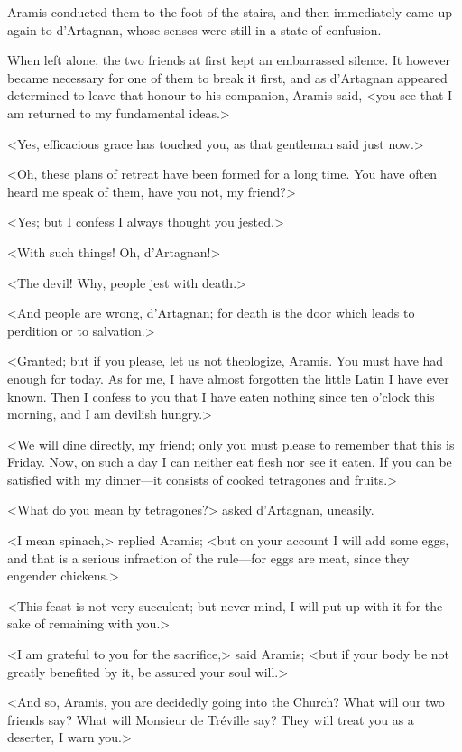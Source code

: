 Aramis conducted them to the foot of the stairs, and then immediately came up again to d'Artagnan, whose senses were still in a state of confusion. 

When left alone, the two friends at first kept an embarrassed silence. It however became necessary for one of them to break it first, and as d'Artagnan appeared determined to leave that honour to his companion, Aramis said, <you see that I am returned to my fundamental ideas.> 

<Yes, efficacious grace has touched you, as that gentleman said just now.> 

<Oh, these plans of retreat have been formed for a long time. You have often heard me speak of them, have you not, my friend?> 

<Yes; but I confess I always thought you jested.> 

<With such things! Oh, d'Artagnan!> 

<The devil! Why, people jest with death.> 

<And people are wrong, d'Artagnan; for death is the door which leads to perdition or to salvation.> 

<Granted; but if you please, let us not theologize, Aramis. You must have had enough for today. As for me, I have almost forgotten the little Latin I have ever known. Then I confess to you that I have eaten nothing since ten o'clock this morning, and I am devilish hungry.> 

<We will dine directly, my friend; only you must please to remember that this is Friday. Now, on such a day I can neither eat flesh nor see it eaten. If you can be satisfied with my dinner---it consists of cooked tetragones and fruits.> 

<What do you mean by tetragones?> asked d'Artagnan, uneasily. 

<I mean spinach,> replied Aramis; <but on your account I will add some eggs, and that is a serious infraction of the rule---for eggs are meat, since they engender chickens.> 

<This feast is not very succulent; but never mind, I will put up with it for the sake of remaining with you.> 

<I am grateful to you for the sacrifice,> said Aramis; <but if your body be not greatly benefited by it, be assured your soul will.> 

<And so, Aramis, you are decidedly going into the Church? What will our two friends say? What will Monsieur de Tréville say? They will treat you as a deserter, I warn you.> 

